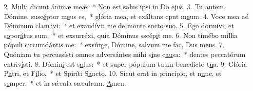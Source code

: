 2. Multi dicunt \uline{á}nimæ m\uline{e}æ:~* Non est salus ipsi in Do \uline{e}jus.
3. Tu autem, Dómine, susc\uline{é}ptor m\uline{e}us es,~* glória mea, et exáltans cput m\uline{e}um.
4. Voce mea ad Dómin\uline{u}m clam\uline{á}vi:~* et exaudívit me de monte sncto s\uline{u}o.
5. Ego dormívi, et s\uline{o}por\uline{á}tus sum:~* et exsurréxi, quia Dóminus sscép\uline{i}t me.
6. Non timébo míllia pópuli c\uline{i}rcumd\uline{á}ntis me:~* exsúrge, Dómine, salvum me fac, Dus m\uline{e}us.
7. Quóniam tu percussísti omnes adversántes mihi s\uline{i}ne c\uline{au}sa:~* dentes peccatórum cntriv\uline{í}sti.
8. Dómin\uline{i} est s\uline{a}lus:~* et super pópulum tuum benedícto t\uline{u}a.
9. Glória P\uline{a}tri, et F\uline{í}lio,~* et Spiríti S\uline{a}ncto.
10. Sicut erat in princípio, et n\uline{u}nc, et s\uline{e}mper,~* et in sǽcula sæculrum. \uline{A}men.
